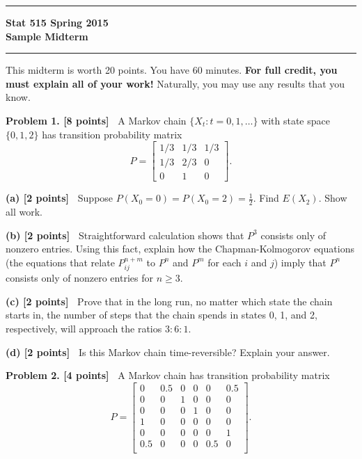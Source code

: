 \documentclass{article}
\newcommand{\svskip}{\vspace{.2in}}
\newcommand{\mvskip}{\vspace{.25in}}
\newcommand{\lvskip}{\vspace{.5in}}
\begin{document}
        \hrule
        \begin{center}
        \Large\bf Stat 515 \hfill Spring 2015\\
        Sample Midterm  \hfill 
        \end{center}
        \hrule


\mvskip 
This midterm is worth 20 points.  You have 60 minutes.  
{\bf For full credit, you must explain all of your work!}
Naturally, you may use any results that you know.

\lvskip 
{\bf Problem 1. [8 points]\ } 
A Markov chain $\{X_t: t=0, 1, \ldots\}$ with state space $\{0, 1, 2\}$ has transition probability matrix
\[
P=
\begin{bmatrix}
1/3 & 1/3 & 1/3 \\ 
1/3 & 2/3 & 0 \\
0 & 1 & 0
\end{bmatrix}.
\]

\svskip
{\bf(a) [2 points]\ }
Suppose $P(X_0=0) = P(X_0=2) = \frac12$.  Find $E(X_2)$.  Show all work.

\svskip 
{\bf(b) [2 points]\ }  
Straightforward calculation shows that
$P^3$ consists only of nonzero entries.
Using this fact, explain how the Chapman-Kolmogorov equations (the equations that relate
$P_{ij}^{n+m}$ to $P^n$ and $P^m$ for each $i$ and $j$) imply that
 $P^n$ consists only of nonzero entries for $n\ge 3$.

\svskip 
{\bf(c) [2 points]\ }  
Prove that in the long run, no matter which state the chain starts in, the number of steps 
that the chain spends in states 0, 1, and 2, respectively, will approach the
ratios $3:6:1$.

\svskip 
{\bf(d) [2 points]\ }  
Is this Markov chain time-reversible? Explain your answer.

\lvskip 
\lvskip 
{\bf Problem 2.  [4 points]\ } 
A Markov chain has transition probability matrix
\[
P=
\begin{bmatrix}
0 & 0.5 & 0 & 0 & 0 & 0.5 \\
0 & 0 & 1 & 0 & 0 & 0 \\
0 & 0 & 0 & 1 & 0 & 0 \\
1 & 0 & 0 & 0 & 0 & 0 \\
0 & 0 & 0 & 0 & 0 & 1 \\
0.5 & 0 & 0 & 0 & 0.5 & 0 \\
\end{bmatrix}.
\]
\end{document}
